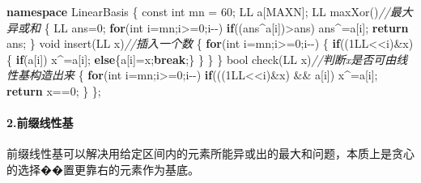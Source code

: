 \documentclass[
]{article}
\newenvironment{Shaded}{}{}
\newcommand{\AttributeTok}[1]{\textcolor[rgb]{0.49,0.56,0.16}{#1}}
\newcommand{\BuiltInTok}[1]{#1}
\newcommand{\CommentTok}[1]{\textcolor[rgb]{0.38,0.63,0.69}{\textit{#1}}}
\newcommand{\ControlFlowTok}[1]{\textcolor[rgb]{0.00,0.44,0.13}{\textbf{#1}}}
\newcommand{\DataTypeTok}[1]{\textcolor[rgb]{0.56,0.13,0.00}{#1}}
\newcommand{\DecValTok}[1]{\textcolor[rgb]{0.25,0.63,0.44}{#1}}
\newcommand{\KeywordTok}[1]{\textcolor[rgb]{0.00,0.44,0.13}{\textbf{#1}}}
\newcommand{\NormalTok}[1]{#1}
\begin{document}
\begin{Shaded}
\begin{Highlighting}[]
\KeywordTok{namespace}\NormalTok{ LinearBasis}
\NormalTok{\{}
    \AttributeTok{const} \DataTypeTok{int}\NormalTok{ mn = }\DecValTok{60}\NormalTok{;}
\NormalTok{    LL a[MAXN];}
\NormalTok{    LL maxXor()}\CommentTok{//最大异或和}
\NormalTok{    \{}
\NormalTok{        LL ans=}\DecValTok{0}\NormalTok{;}
        \ControlFlowTok{for}\NormalTok{(}\DataTypeTok{int}\NormalTok{ i=mn;i\textgreater{}=}\DecValTok{0}\NormalTok{;i{-}{-})}
            \ControlFlowTok{if}\NormalTok{((ans\^{}a[i])\textgreater{}ans)}
\NormalTok{                ans\^{}=a[i];}
        \ControlFlowTok{return}\NormalTok{ ans;}
\NormalTok{    \}}
    \DataTypeTok{void}\NormalTok{ insert(LL x)}\CommentTok{//插入一个数}
\NormalTok{    \{}
        \ControlFlowTok{for}\NormalTok{(}\DataTypeTok{int}\NormalTok{ i=mn;i\textgreater{}=}\DecValTok{0}\NormalTok{;i{-}{-})}
\NormalTok{        \{}
            \ControlFlowTok{if}\NormalTok{((}\DecValTok{1}\BuiltInTok{LL}\NormalTok{\textless{}\textless{}i)\&x)}
\NormalTok{            \{}
                \ControlFlowTok{if}\NormalTok{(a[i]) x\^{}=a[i];}
                \ControlFlowTok{else}\NormalTok{\{a[i]=x;}\ControlFlowTok{break}\NormalTok{;\}}
\NormalTok{            \}}
\NormalTok{        \}}
\NormalTok{    \}}
    \DataTypeTok{bool}\NormalTok{ check(LL x)}\CommentTok{//判断x是否可由线性基构造出来}
\NormalTok{    \{}
        \ControlFlowTok{for}\NormalTok{(}\DataTypeTok{int}\NormalTok{ i=mn;i\textgreater{}=}\DecValTok{0}\NormalTok{;i{-}{-})}
            \ControlFlowTok{if}\NormalTok{(((}\DecValTok{1}\BuiltInTok{LL}\NormalTok{\textless{}\textless{}i)\&x) \&\& a[i])}
\NormalTok{                x\^{}=a[i];}
        \ControlFlowTok{return}\NormalTok{ x==}\DecValTok{0}\NormalTok{;}
\NormalTok{    \}}
\NormalTok{\};}
\end{Highlighting}
\end{Shaded}

\hypertarget{ux524dux7f00ux7ebfux6027ux57fa}{%
\paragraph{2.前缀线性基}\label{ux524dux7f00ux7ebfux6027ux57fa}}

前缀线性基可以解决用给定区间内的元素所能异或出的最大和问题，本质上是贪心的选择��置更靠右的元素作为基底。
\end{document}
